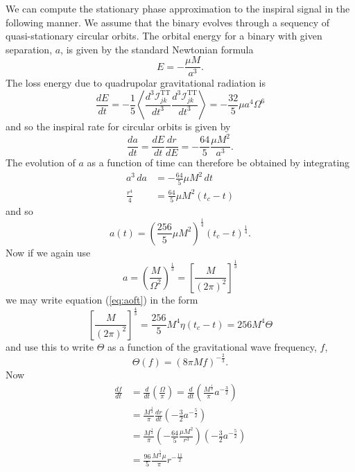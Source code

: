 We can compute the stationary phase approximation to the inspiral signal in
the following manner. We assume that the binary evolves through a sequency of
quasi-stationary circular orbits. The orbital energy for a binary with given
separation, $a$, is given by the standard Newtonian formula
\begin{equation}
E = -\frac{\mu M}{a^3}.
\end{equation}
The loss energy due to quadrupolar gravitational radiation is\cite{MTW73}
\begin{equation}
\frac{dE}{dt} = - \frac{1}{5} \left\langle 
\frac{d^3 \mathcal{I}^\mathrm{TT}_{jk}}{dt^3}
\frac{d^3 \mathcal{I}^\mathrm{TT}_{jk}}{dt^3}
\right\rangle = - \frac{32}{5}\mu a^4 \Omega^6
\end{equation}
and so the inspiral rate for circular orbits is given by
\begin{equation}
\frac{da}{dt} = \frac{dE}{dt}\frac{dr}{dE} = - \frac{64}{5}\frac{\mu
M^2}{a^3}.
\end{equation}
The evolution of $a$ as a function of time can therefore be obtained by
integrating
\begin{align}
a^3 \, da &= - \frac{64}{5} \mu M^2 \, dt \\
\frac{r^4}{4} &= \frac{64}{5} \mu M^2 (t_c - t)
\end{align}
and so
\begin{equation}
a(t) = \left(\frac{256}{5} \mu M^2 \right)^{\frac{1}{4}}
       \left(t_c - t\right)^{\frac{1}{4}}.
\label{eq:aoft}
\end{equation}
Now if we again use 
\begin{equation}
a = \left(\frac{M}{\Omega^2}\right)^\frac{1}{3} = 
\left[ \frac{M}{(2\pi)^2} \right]^\frac{1}{3}
\label{eq:aoff}
\end{equation}
we may write equation (\ref{eq:aoft}) in the form
\begin{equation}
\left[\frac{M}{(2\pi)^2}\right]^\frac{4}{3} = \frac{256}{5} M^4\eta(t_c - t) =
256 M^4 \Theta
\end{equation}
and use this to write $\Theta$ as a function of the gravitational wave
frequency, $f$,
\begin{equation}
\Theta(f) = \left(8\pi M f\right)^{-\frac{2}{3}}.
\label{eq:thetaoff}
\end{equation}
Now
\begin{align}
\frac{df}{dt} 
     &= \frac{d}{dt} \left(\frac{\Omega}{\pi}\right) 
      = \frac{d}{dt} \left(\frac{M^\frac{1}{2}}{\pi} a^{-\frac{3}{2}}\right) \\
     &= \frac{M^\frac{1}{2}}{\pi} \frac{dr}{dt} \left(-\frac{3}{2} a^{-\frac{5}{2}}\right) \\
     &= \frac{M^\frac{1}{2}}{\pi} \left(-\frac{64}{5} \frac{\mu M^2}{r^3}\right)
        \left(-\frac{3}{2} a^{-\frac{5}{2}}\right) \\
     &= \frac{96}{5} \frac{M^\frac{5}{2} \mu}{\pi} r^{-\frac{11}{2}}
\label{eq:spdfdt}
\end{align}
